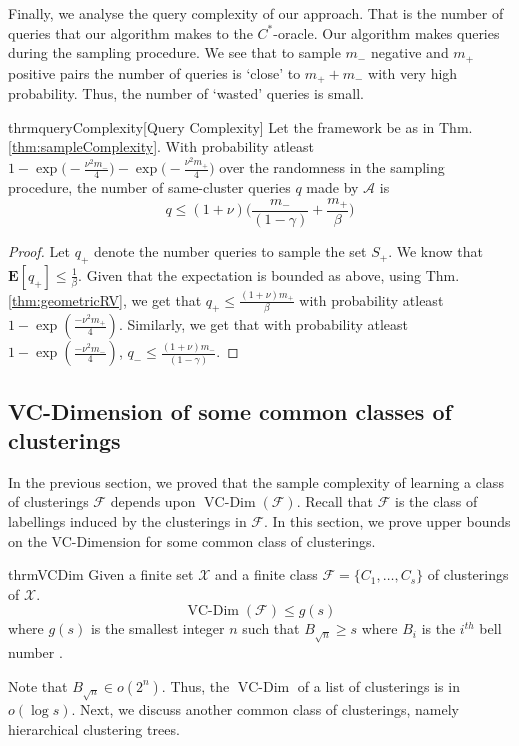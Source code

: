 \documentclass[12pt]{article}
\newcommand{\mb}{\mathbf}
\newcommand{\mc}{\mathcal}
\DeclareMathOperator*{\vcdim}{VC-Dim}
\begin{document}
Finally, we analyse the query complexity of our approach. That is the number of queries that our algorithm makes to the $C^*$-oracle. Our algorithm makes queries during the sampling procedure. We see that to sample $m_-$ negative and $m_+$ positive pairs the number of queries is `close' to $m_+ + m_-$ with very high probability. Thus, the number of `wasted' queries is small.  

\begin{restatable}{thrm}{queryComplexity}[Query Complexity]
\label{thm:queryComplexity}
Let the framework be as in Thm. \ref{thm:sampleComplexity}. With probability atleast $1-\exp\big(-\frac{\nu^2m_-}{4}) - \exp\big(-\frac{\nu^2m_+}{4}\big)$ over the randomness in the sampling procedure, the number of same-cluster queries $q$ made by $\mc A$ is  
$$q \le (1+\nu)\bigg(\frac{m_-}{(1-\gamma)} + \frac{m_+}{\beta}\bigg)$$
\end{restatable}
\begin{proof}
Let $q_+$ denote the number queries to sample the set $S_+$. We know that $\mb E[q_+] \le \frac{1}{\beta}$. Given that the expectation is bounded as above, using Thm. \ref{thm:geometricRV}, we get that $q_+ \le \frac{(1+\nu)m_+}{\beta}$ with probability atleast $1-\exp(\frac{-\nu^2m_+}{4})$. Similarly, we get that with probability atleast $1-\exp(\frac{-\nu^2m_-}{4})$, $q_- \le \frac{(1+\nu)m_-}{(1-\gamma)}$.
\end{proof}

\subsection{VC-Dimension of some common classes of clusterings}
In the previous section, we proved that the sample complexity of learning a class of clusterings $\mc F$ depends upon $\vcdim({\mc F})$. Recall that ${\mc F}$ is the class of labellings induced by the clusterings in $\mc F$. In this section, we prove upper bounds on the VC-Dimension for some common class of clusterings. 

\begin{restatable}{thrm}{VCDim}
Given a finite set $\mc X$ and a finite class $\mc F = \{C_1, \ldots, C_s\}$ of clusterings of $\mc X$.
$$\vcdim({\mc F}) \le g(s)$$ where $g(s)$ is the smallest integer $n$ such that $B_{\sqrt n} \ge s$ where $B_i$ is the $i^{th}$ bell number \cite{bell2010number}. 
\end{restatable}


\noindent Note that $B_{\sqrt n} \in o(2^{n})$. Thus, the $\vcdim$ of a list of clusterings is in $o( \log s)$. Next, we discuss another common class of clusterings, namely hierarchical clustering trees. 
\end{document}
